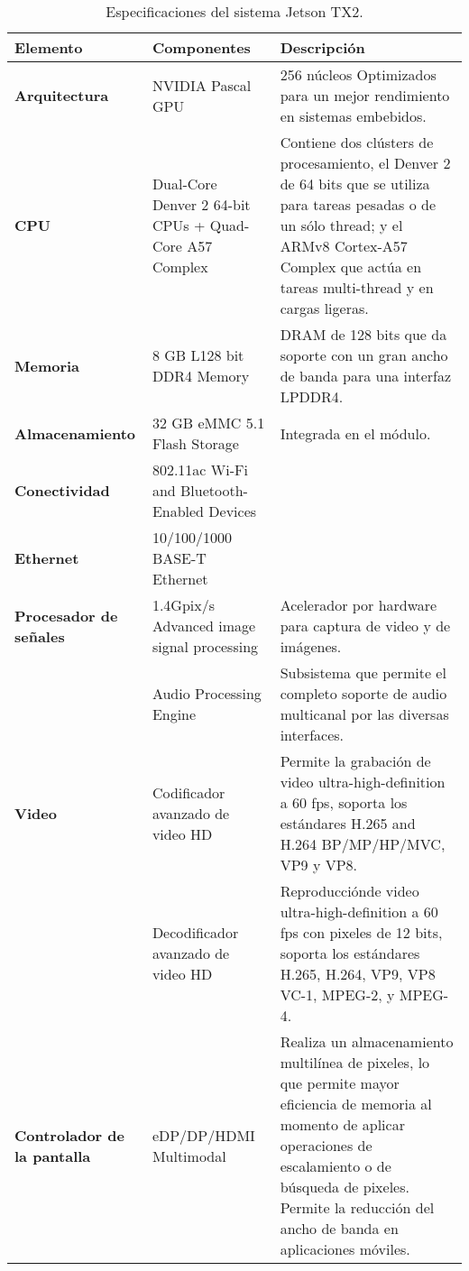     \begin{table}[h!]
      \begin{center}
            \scriptsize
        \begin{tabular}{|m{2.5cm}|m{6cm}|m{6.5cm}|}
         \hline
        \cellcolor{lightgray}\textbf{Elemento} & \cellcolor{lightgray} \textbf{Componentes} & \cellcolor{lightgray} \textbf{Descripción}\\ 
         \hline
         \textbf{Arquitectura} & NVIDIA Pascal GPU & 256 núcleos Optimizados para un mejor rendimiento en sistemas embebidos.\\
         \hline
         \textbf{CPU} & Dual-Core Denver 2 64-bit CPUs + Quad-Core A57 Complex & Contiene dos clústers de procesamiento, el Denver 2 de 64 bits que se utiliza para tareas pesadas o de un sólo thread; y el ARMv8 Cortex-A57 Complex que actúa en tareas multi-thread y en cargas ligeras.\\
         \hline
         \textbf{Memoria} & 8 GB L128 bit DDR4 Memory & DRAM de 128 bits que da soporte con un gran ancho de banda para una interfaz LPDDR4.  \\
          \hline
    	\textbf{Almacenamiento} & 32 GB eMMC 5.1 Flash Storage & Integrada en el módulo.\\
         \hline
    	\textbf{Conectividad} & 802.11ac Wi-Fi and Bluetooth-Enabled Devices & \\
         \hline
   	 \textbf{Ethernet} &10/100/1000 BASE-T Ethernet & \\
	  \hline
   	 \textbf{Procesador de señales} &1.4Gpix/s Advanced image signal processing & Acelerador por hardware para captura de video y de imágenes.\\
	 &Audio Processing Engine & Subsistema que permite el completo soporte de audio multicanal por las diversas interfaces.\\
	 \hline
   	 \textbf{Video} & Codificador avanzado de video HD & Permite la grabación de video ultra-high-definition a 60 fps, soporta los estándares H.265 and H.264 BP/MP/HP/MVC, VP9 y VP8. \\
	  & Decodificador avanzado de video HD & Reproducciónde video ultra-high-definition a 60 fps con pixeles de 12 bits, soporta los estándares H.265, H.264, VP9, VP8 VC-1, MPEG-2, y MPEG-4. \\
         \hline
   	 \textbf{Controlador de la pantalla} &eDP/DP/HDMI Multimodal & Realiza un almacenamiento multilínea de \gls{pixel}es, lo que permite mayor eficiencia de memoria al momento de aplicar operaciones de escalamiento o de búsqueda de pixeles. Permite la reducción del ancho de banda en aplicaciones móviles.\\
         \hline
        \end{tabular}
        \caption{Especificaciones del sistema Jetson TX2\cite{jtx2dk}.}
        \label{tab:jetson}
      \end{center}
    \end{table}
       
